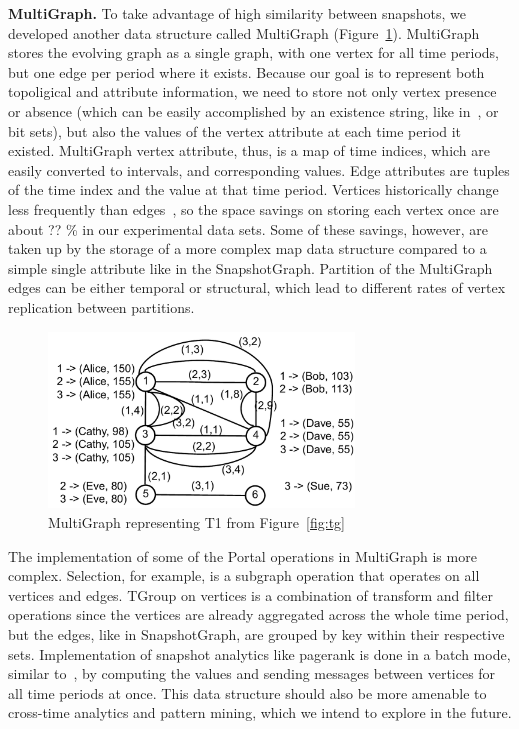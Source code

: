 {\bf MultiGraph.}  To take advantage of high similarity between
snapshots, we developed another data structure called MultiGraph
(Figure~\ref{fig:mg}).  MultiGraph stores the evolving graph as a
single graph, with one vertex for all time periods, but one edge per
period where it exists.  Because our goal is to represent both
topoligical and attribute information, we need to store not only
vertex presence or absence (which can be easily accomplished by an
existence string, like in~\cite{Kan2009}, or bit sets), but also the
values of the vertex attribute at each time period it existed.
MultiGraph vertex attribute, thus, is a map of time indices, which are
easily converted to intervals, and corresponding values.  Edge
attributes are tuples of the time index and the value at that time
period.  Vertices historically change less frequently than
edges~\cite{?}, so the space savings on storing each vertex once are
about ?? \% in our experimental data sets.  Some of these savings,
however, are taken up by the storage of a more complex map data
structure compared to a simple single attribute like in the
SnapshotGraph.  Partition of the MultiGraph edges can be either
temporal or structural, which lead to different rates of vertex
replication between partitions.

\begin{figure}[t!]
\includegraphics[width=3.2in]{figs/mg.pdf}
\caption{MultiGraph representing T1 from Figure~\ref{fig:tg}}
\label{fig:mg}
\end{figure}

The implementation of some of the Portal operations in MultiGraph is
more complex.  Selection, for example, is a subgraph operation that
operates on all vertices and edges.  TGroup on vertices is a
combination of transform and filter operations since the vertices are
already aggregated across the whole time period, but the edges, like
in SnapshotGraph, are grouped by key within their respective sets.
Implementation of snapshot analytics like pagerank is done in a batch
mode, similar to~\cite{DBLP:journals/tos/MiaoHLWYZPCC15}, by computing
the values and sending messages between vertices for all time periods
at once.  This data structure should also be more amenable to
cross-time analytics and pattern mining, which we intend to explore in
the future.

